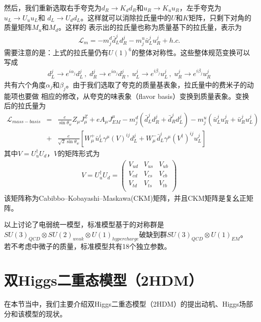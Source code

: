 然后，我们重新选取右手夸克为$d_R \to K_d d_R$和$u_R \to K_u u_R$，左手夸克为$u_L \to U_u u_L$和
$d_L \to U_d d_L$。这样就可以消除拉氏量中的$U$和$K$矩阵，只剩下对角的质量矩阵$M_u$和$M_d$。这样的
表示出的拉氏量也称为质量基下的拉氏量，表示为
\begin{eqnarray}
\mathscr{L}_m = -m^d_j \bar{d}^j_L d^j_R - m^u_j \bar{u}^j_L u^j_R + h.c.
\end{eqnarray}
需要注意的是：上式的拉氏量仍有$U(1)^6$的整体对称性。这些整体规范变换可以写成
\begin{eqnarray}
d^j_L \to e^{i\alpha_j}d^j_L\,, \; d^j_R \to e^{i\alpha_j}d^j_R\,, \;
u^j_L \to e^{i\beta_j}u^j_L\,, \; u^j_R \to e^{i\beta_j}u^j_R
\end{eqnarray}
共有六个角度$\alpha_j$和$\beta_j$。由于我们选取了夸克的质量基表象，拉氏量中的费米子的动能项也要做
相应的修改，从夸克的味表象（flavor basis）变换到质量表象。变换后的拉氏量为
\begin{eqnarray}
\mathscr{L}_{mass-basis} &=& \frac{e}{\sin\theta_w}Z_{\mu}J^Z_{\mu} + eA_{\mu}J^{\mu}_{EM} 
- m^d_j (\bar{d}^j_L d^j_R + \bar{d}^j_R d^j_L) - m^u_j (\bar{u}^j_L u^j_R + \bar{u}^j_R u^j_L)
\nonumber \\
&+& \frac{e}{\sqrt{2}\sin\theta_w}\left[W^+_{\mu}\bar{u}^i_L \gamma^{\mu}(V)^{ij}d^j_L +
W^-_{\mu} \bar{d}^i_L \gamma^{\mu} (V^{\dagger})^{ij} u^j_L \right]
\end{eqnarray}
其中$V = U^{\dagger}_u U_d$，$V$的矩阵形式为
\begin{eqnarray}
V = U^{\dagger}_u U_d = \left( \begin{array}{ccc} 
V_{ud} & V_{us} & V_{ub} \\
V_{cd} & V_{cs} & V_{cb} \\
V_{td} & V_{ts} & V_{tb} \\
\end{array}\right)
\end{eqnarray}
该矩阵称为Cabibbo–Kobayashi–Maskawa(CKM)矩阵，并且CKM矩阵是复幺正矩阵。

以上讨论了电弱统一模型，标准模型基于的对称群是
$SU(3)_{QCD}\otimes SU(2)_{weak}\otimes U(1)_{hypercharge}$破缺到群$SU(3)_{QCD}\otimes U(1)_{EM}$。
若不考虑中微子的质量，标准模型共有18个独立参数。




\section{双Higgs二重态模型（2HDM）}
在本节当中，我们主要介绍双Higgs二重态模型（2HDM）的提出动机、Higgs场部分和该模型的现状。

